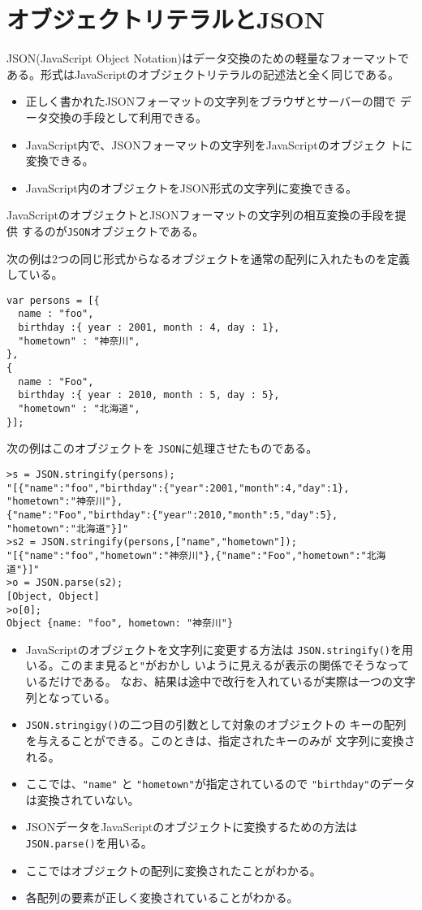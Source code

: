 \section{オブジェクトリテラルとJSON}
JSON(JavaScript Object Notation)はデータ交換のための軽量なフォーマットで
ある。形式はJavaScriptのオブジェクトリテラルの記述法と全く同じである。
\begin{itemize}
 \item 正しく書かれたJSONフォーマットの文字列をブラウザとサーバーの間で
       データ交換の手段として利用できる。
 \item JavaScript内で、JSONフォーマットの文字列をJavaScriptのオブジェク
       トに変換できる。
 \item JavaScript内のオブジェクトをJSON形式の文字列に変換できる。
\end{itemize}

JavaScriptのオブジェクトとJSONフォーマットの文字列の相互変換の手段を提供
するのが\texttt{JSON}オブジェクトである。

\begin{Exec}\label{JSONExec}\upshape
次の例は2つの同じ形式からなるオブジェクトを通常の配列に入れたものを定義
 している。
\begin{Verbatim}
var persons = [{
  name : "foo",
  birthday :{ year : 2001, month : 4, day : 1},
  "hometown" : "神奈川",
},
{
  name : "Foo",
  birthday :{ year : 2010, month : 5, day : 5},
  "hometown" : "北海道",
}];
\end{Verbatim}
次の例はこのオブジェクトを \texttt{JSON}に処理させたものである。
\begin{Verbatim}
>s = JSON.stringify(persons);
"[{"name":"foo","birthday":{"year":2001,"month":4,"day":1},
"hometown":"神奈川"},
{"name":"Foo","birthday":{"year":2010,"month":5,"day":5},
"hometown":"北海道"}]"
>s2 = JSON.stringify(persons,["name","hometown"]);
"[{"name":"foo","hometown":"神奈川"},{"name":"Foo","hometown":"北海道"}]"
>o = JSON.parse(s2);
[Object, Object]
>o[0];
Object {name: "foo", hometown: "神奈川"}
\end{Verbatim}
\begin{itemize}
 \item JavaScriptのオブジェクトを文字列に変更する方法は
       \texttt{JSON.stringify()}を用いる。このまま見ると\verb+"+がおかし
       いように見えるが表示の関係でそうなっているだけである。%
なお、結果は途中で改行を入れているが実際は一つの文字列となっている。
 \item \texttt{JSON.stringigy()}の二つ目の引数として対象のオブジェクトの
       キーの配列を与えることができる。このときは、指定されたキーのみが
       文字列に変換される。
 \item ここでは、\verb+"name"+ と \verb+"hometown"+が指定されているので
\verb+"birthday"+のデータは変換されていない。
 \item JSONデータをJavaScriptのオブジェクトに変換するための方法は
       \texttt{JSON.parse()}を用いる。
 \item ここではオブジェクトの配列に変換されたことがわかる。
 \item 各配列の要素が正しく変換されていることがわかる。
\end{itemize}
\end{Exec}

